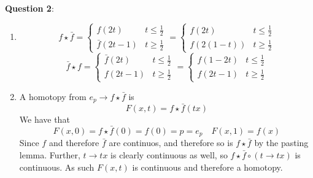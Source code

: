 \documentclass{article} %
\newcommand{\question}[2][]{
  \begin{flushleft}
    \textbf{Question #1}: \textit{#2}

\end{flushleft}}
\begin{document}
\question[2]{}

\begin{enumerate}
  \item
    \[
      f \star \bar f =
      \begin{cases}
        f(2t)&  t \le \frac{1}{2} \\
        \bar f(2t - 1) & t \ge \frac{1}{2}
      \end{cases}
      =
      \begin{cases}
        f(2t)&  t \le \frac{1}{2} \\
        f(2(1 - t)) & t \ge \frac{1}{2}
      \end{cases}
    \]
    \[
      \bar f \star  f =
      \begin{cases}
        \bar f(2t)&  t \le \frac{1}{2} \\
        f(2t - 1) & t \ge \frac{1}{2}
      \end{cases}
      =
      \begin{cases}
        f(1-2t)&  t \le \frac{1}{2} \\
        f(2t-1) & t \ge \frac{1}{2}
      \end{cases}
    \]
  \item A homotopy from $e_p \to f \star \bar f$ is
    \[
      F(x,t) = f \star \bar f (tx)
    \]
    We have that
    $$F(x, 0) = f\star\bar f(0) = f(0) = p = e_p \quad F(x,1) = f(x)$$
    Since $f$ and therefore $\bar f$ are continuos, and therefore so
    is $f\star \bar f$ by the pasting lemma. Further, $t \to tx$ is
    clearly continuous as well, so $f \star \bar f \circ (t \to tx)$
    is continuous. As such $F(x,t)$ is continuous and therefore a homotopy.
\end{enumerate}
\end{document}
